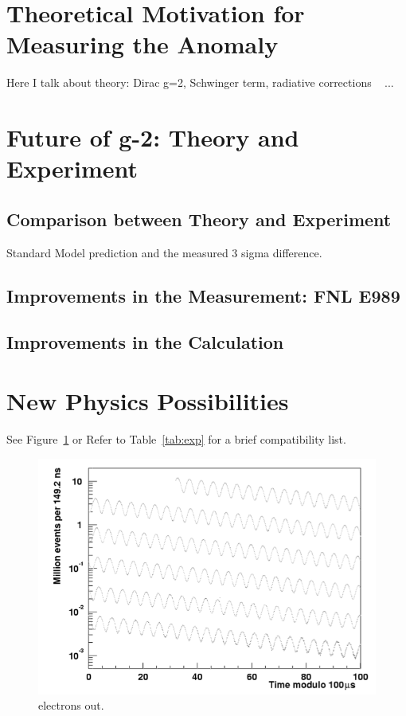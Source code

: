 \documentclass{outhesis}
\begin{document}
\section{Theoretical Motivation for Measuring the Anomaly}

Here I talk about theory: Dirac g=2, Schwinger term, radiative corrections  ~\cite{Doug} ... \\




\section{Future of g-2: Theory and Experiment}
\subsection{Comparison between Theory and Experiment}
Standard Model prediction and the measured 3 sigma difference.
\subsection{Improvements in the Measurement: FNL E989}
\subsection{Improvements in the Calculation}

\section{New Physics Possibilities}

See Figure~\ref{fig:osc} or Refer to Table~\ref{tab:exp} for a brief compatibility list.

\begin{figure}
  \centering
  \includegraphics[scale=0.5]{figures/oscillation}
  \caption{electrons out.}
  \label{fig:osc}
\end{figure}
\end{document}
